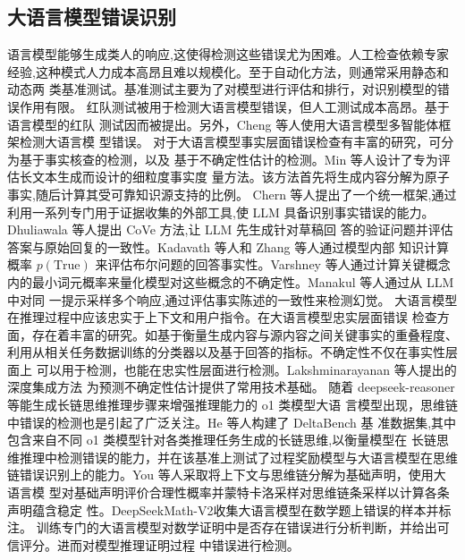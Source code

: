 \subsection{大语言模型错误识别}
语言模型能够生成类人的响应,这使得检测这些错误尤为困难。人工检查依赖专家
经验,这种模式人力成本高昂且难以规模化。至于自动化方法，则通常采用静态和动态两
类基准测试。基准测试主要为了对模型进行评估和排行，对识别模型的错误作用有限。
红队测试被用于检测大语言模型错误\cite{ref03_dinan2019build}，但人工测试成本高昂。基于语言模型的红队
测试因而被提出\cite{ref04_perez2022red}。另外，Cheng 等人\cite{ref05_cheng2024autodetect}使用大语言模型多智能体框架检测大语言模
型错误。
对于大语言模型事实层面错误检查有丰富的研究，可分为基于事实核查的检测，以及
基于不确定性估计的检测。Min 等人\cite{ref06_min2023factscore}设计了专为评估长文本生成而设计的细粒度事实度
量方法。该方法首先将生成内容分解为原子事实,随后计算其受可靠知识源支持的比例。
Chern 等人\cite{ref07_chern2023factool}提出了一个统一框架,通过利用一系列专门用于证据收集的外部工具,使 LLM
具备识别事实错误的能力。Dhuliawala 等人\cite{ref08_dhuliawala2023cove}提出 CoVe 方法,让 LLM 先生成针对草稿回
答的验证问题并评估答案与原始回复的一致性。Kadavath 等人\cite{ref09_kadavath2022language}和 Zhang 等人\cite{ref10_zhang2024selfalignment}通过模型内部
知识计算概率 \(p(\mathrm{True})\) 来评估布尔问题的回答事实性。Varshney 等人\cite{ref11_varshney2023stitch}通过计算关键概念
内的最小词元概率来量化模型对这些概念的不确定性。Manakul 等人\cite{ref12_manakul2023selfcheckgpt}通过从 LLM 中对同
一提示采样多个响应,通过评估事实陈述的一致性来检测幻觉。
大语言模型在推理过程中应该忠实于上下文和用户指令。在大语言模型忠实层面错误
检查方面，存在着丰富的研究。如基于衡量生成内容与源内容之间关键事实的重叠程度、
利用从相关任务数据训练的分类器以及基于回答的指标\cite{ref13_falke2019ranking}。不确定性不仅在事实性层面上
可以用于检测，也能在忠实性层面进行检测。Lakshminarayanan 等人\cite{ref14_lakshminarayanan2017simple}提出的深度集成方法
为预测不确定性估计提供了常用技术基础。
随着 deepseek-reasoner 等能生成长链思维推理步骤来增强推理能力的 o1 类模型大语
言模型出现，思维链中错误的检测也是引起了广泛关注。He 等人\cite{ref15_he2025large}构建了 DeltaBench 基
准数据集,其中包含来自不同 o1 类模型针对各类推理任务生成的长链思维,以衡量模型在
长链思维推理中检测错误的能力，并在该基准上测试了过程奖励模型与大语言模型在思维
链错误识别上的能力。You 等人\cite{ref16_you2025probabilistic}采取将上下文与思维链分解为基础声明，使用大语言模
型对基础声明评价合理性概率并蒙特卡洛采样对思维链条采样以计算各条声明蕴含稳定
性。DeepSeekMath-V2\cite{shao2025deepseekmath}收集大语言模型在数学题上错误的样本并标注。
训练专门的大语言模型对数学证明中是否存在错误进行分析判断，并给出可信评分。进而对模型推理证明过程
中错误进行检测。



